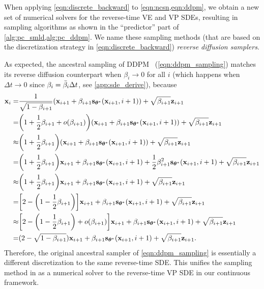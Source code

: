 When applying \cref{eqn:discrete_backward} to \cref{eqn:ncsn,eqn:ddpm}, we obtain a new set of numerical solvers for the reverse-time VE and VP SDEs, resulting in sampling algorithms as shown in the ``predictor'' part of \cref{alg:pc_smld,alg:pc_ddpm}. We name these sampling methods (that are based on the discretization strategy in \cref{eqn:discrete_backward}) \emph{reverse diffusion samplers}. 

As expected, the ancestral sampling of DDPM~\citep{ho2020denoising} (\cref{eqn:ddpm_sampling}) matches its reverse diffusion counterpart when $\beta_i \to 0$ for all $i$ (which happens when $\Delta t \to 0$ since $\beta_i = \bar{\beta}_i \Delta t$, see \cref{app:sde_derive}), because
\begin{align*}
    \mathbf{x}_i = &\frac{1}{\sqrt{1-\beta_{i+1}}}(\mathbf{x}_{i+1} + \beta_{i+1} \mathbf{s}_{{\boldsymbol{\theta}}^*}(\mathbf{x}_{i+1}, i+1)) + \sqrt{\beta_{i+1}} \mathbf{z}_{i+1}\\
    =&  \bigg( 1 + \frac{1}{2}\beta_{i+1} + o(\beta_{i+1}) \bigg)(\mathbf{x}_{i+1} + \beta_{i+1} \mathbf{s}_{{\boldsymbol{\theta}}^*}(\mathbf{x}_{i+1}, i+1)) + \sqrt{\beta_{i+1}} \mathbf{z}_{i+1}\\
    \approx & \bigg( 1 + \frac{1}{2}\beta_{i+1} \bigg)(\mathbf{x}_{i+1} + \beta_{i+1} \mathbf{s}_{{\boldsymbol{\theta}}^*}(\mathbf{x}_{i+1}, i+1)) + \sqrt{\beta_{i+1}} \mathbf{z}_{i+1}\\
    =&\bigg(1 + \frac{1}{2}\beta_{i+1} \bigg) \mathbf{x}_{i+1} + \beta_{i+1}\mathbf{s}_{{\boldsymbol{\theta}}^*}(\mathbf{x}_{i+1}, i+1) + \frac{1}{2}\beta_{i+1}^2 \mathbf{s}_{{\boldsymbol{\theta}}^*}(\mathbf{x}_{i+1}, i+1) + \sqrt{\beta_{i+1}} \mathbf{z}_{i+1}\\
    \approx& \bigg(1 + \frac{1}{2}\beta_{i+1} \bigg) \mathbf{x}_{i+1} + \beta_{i+1}\mathbf{s}_{{\boldsymbol{\theta}}^*}(\mathbf{x}_{i+1}, i+1) + \sqrt{\beta_{i+1}} \mathbf{z}_{i+1}\\
    =& \bigg[2 - \bigg(1 - \frac{1}{2}\beta_{i+1}\bigg) \bigg] \mathbf{x}_{i+1} + \beta_{i+1}\mathbf{s}_{{\boldsymbol{\theta}}^*}(\mathbf{x}_{i+1}, i+1) + \sqrt{\beta_{i+1}} \mathbf{z}_{i+1}\\
    \approx& \bigg[2 - \bigg(1 - \frac{1}{2}\beta_{i+1}\bigg) + o(\beta_{i+1}) \bigg] \mathbf{x}_{i+1} + \beta_{i+1}\mathbf{s}_{{\boldsymbol{\theta}}^*}(\mathbf{x}_{i+1}, i+1) + \sqrt{\beta_{i+1}} \mathbf{z}_{i+1}\\
    =& (2 - \sqrt{1-\beta_{i+1}})\mathbf{x}_{i+1} + \beta_{i+1}\mathbf{s}_{{\boldsymbol{\theta}}^*}(\mathbf{x}_{i+1}, i+1)+ \sqrt{\beta_{i+1}} \mathbf{z}_{i+1}.
\end{align*}
Therefore, the original ancestral sampler of \cref{eqn:ddpm_sampling} is essentially a different discretization to the same reverse-time SDE. This unifies the sampling method in \citet{ho2020denoising} as a numerical solver to the reverse-time VP SDE in our continuous framework. %


